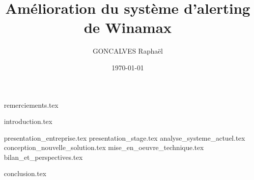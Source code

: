 \documentclass{rUTT}
\date{\today}
\author{{\sc GONCALVES} Raphaël
}
\title{Amélioration du système d'alerting de Winamax}
\begin{document}

    \frontpageSTB %

    {
        \myILB
    }


    \pagestyle{UTT} %
    \justifying %


    {remerciements.tex} %

    \clearpage


    {
        \setcounter{tocdepth}{1}
        \renewcommand{\contentsname}{Sommaire}
        \tableofcontents
    }

    \clearpage


    \clearpage


    {introduction.tex}

    \clearpage

    {presentation_entreprise.tex}
    {presentation_stage.tex}
    {analyse_systeme_actuel.tex}
    {conception_nouvelle_solution.tex}
    {mise_en_oeuvre_technique.tex}
    {bilan_et_perspectives.tex}
    

    \clearpage

    {conclusion.tex}
    \label{LastPage}

    \clearpage

    {
        \raggedright %
        \sloppy
        \nocite{*} %
        \printbibliography[title={Bibliographie},heading=bibintoc]
    }
\end{document}

